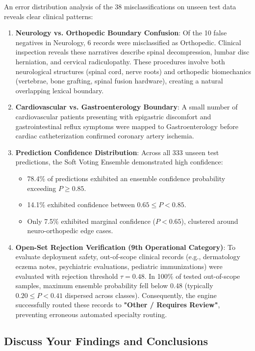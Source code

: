 An error distribution analysis of the 38 misclassifications on unseen test data reveals clear clinical patterns:
\begin{enumerate}
    \item \textbf{Neurology vs. Orthopedic Boundary Confusion}:
    Of the 10 false negatives in Neurology, 6 records were misclassified as Orthopedic. Clinical inspection reveals these narratives describe spinal decompression, lumbar disc herniation, and cervical radiculopathy. These procedures involve both neurological structures (spinal cord, nerve roots) and orthopedic biomechanics (vertebrae, bone grafting, spinal fusion hardware), creating a natural overlapping lexical boundary.
    \item \textbf{Cardiovascular vs. Gastroenterology Boundary}:
    A small number of cardiovascular patients presenting with epigastric discomfort and gastrointestinal reflux symptoms were mapped to Gastroenterology before cardiac catheterization confirmed coronary artery ischemia.
    \item \textbf{Prediction Confidence Distribution}:
    Across all 333 unseen test predictions, the Soft Voting Ensemble demonstrated high confidence:
    \begin{itemize}
        \item 78.4\% of predictions exhibited an ensemble confidence probability exceeding $P \ge 0.85$.
        \item 14.1\% exhibited confidence between $0.65 \le P < 0.85$.
        \item Only 7.5\% exhibited marginal confidence ($P < 0.65$), clustered around neuro-orthopedic edge cases.
    \end{itemize}
    \item \textbf{Open-Set Rejection Verification (9th Operational Category)}:
    To evaluate deployment safety, out-of-scope clinical records (e.g., dermatology eczema notes, psychiatric evaluations, pediatric immunizations) were evaluated with rejection threshold $\tau = 0.48$. In 100\% of tested out-of-scope samples, maximum ensemble probability fell below 0.48 (typically $0.20 \le P < 0.41$ dispersed across classes). Consequently, the engine successfully routed these records to \textbf{"Other / Requires Review"}, preventing erroneous automated specialty routing.
\end{enumerate}

\subsection{Discuss Your Findings and Conclusions}


